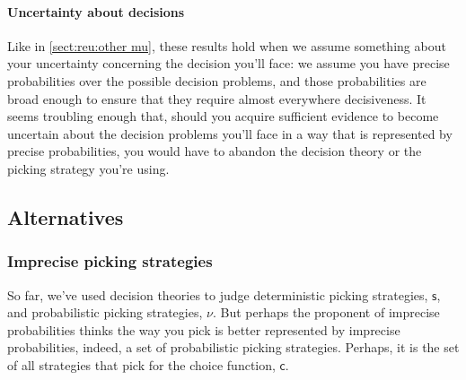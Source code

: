 \documentclass[a4paper]{article}
\newtheorem{proposition}[theorem]{Proposition}
\newcommand\N{\mathbf{N}}
\newcommand\s{\mathsf{s}}
\renewcommand\c{\mathsf{c}} %
\newcommand\EU{\mathrm{EU}}
\newenvironment{CCM rewritten}
{\begingroup\color{blue}} %
{\endgroup}              %
\begin{document}
%
%


{
	\paragraph{Uncertainty about decisions}
	Like in \cref{sect:reu:other mu}, these results hold when we assume something about your uncertainty concerning the decision you'll face: we assume you have precise probabilities over the possible decision problems, and those probabilities are broad enough to ensure that they require almost everywhere decisiveness. It seems troubling enough that, should you acquire sufficient evidence to become uncertain about the decision problems you'll face in a way that is represented by precise probabilities, you would have to abandon the decision theory or the picking strategy you're using. 
}

	
	\subsection{Alternatives}
	
	\subsubsection{Imprecise picking strategies}\label{IPpicking}
	So far, we've used decision theories to judge deterministic picking strategies, $\s$, and probabilistic picking strategies, $\nu$. 
	But perhaps the proponent of imprecise probabilities thinks the way you pick is better represented by imprecise probabilities, indeed, a set of probabilistic picking strategies. Perhaps, it is the set of all strategies that pick for the choice function, $\c$. 
	
\end{document}
